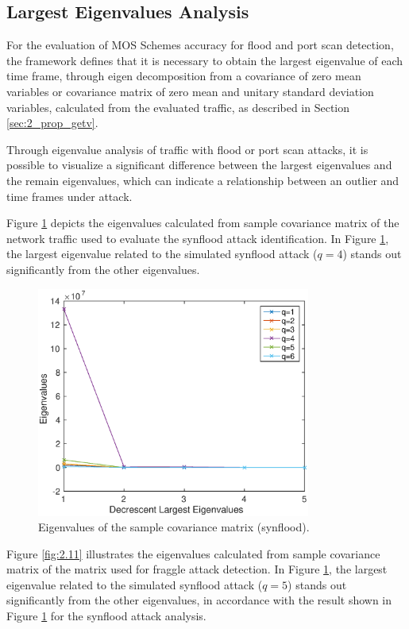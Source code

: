 \subsection{Largest Eigenvalues Analysis}
\label{sec:2_largesteigenvaluesanalysis}

For the evaluation of MOS Schemes accuracy for flood and port scan detection, the framework defines that it is necessary to obtain the largest eigenvalue of each time frame, through eigen decomposition from a covariance of zero mean variables or covariance matrix of zero mean and unitary standard deviation variables, calculated from the evaluated traffic, as described in Section \ref{sec:2_prop_getv}. 

Through eigenvalue analysis of traffic with flood or port scan attacks, it is possible to visualize a significant difference between the largest eigenvalues and the remain eigenvalues, which can indicate a relationship between an outlier and time frames under attack.

Figure \ref{fig:2.10} depicts the eigenvalues calculated from sample covariance matrix of the network traffic used to evaluate the synflood attack identification. In Figure \ref{fig:2.10}, the largest eigenvalue related to the simulated synflood attack ($q = 4$) stands out significantly from the other eigenvalues.

\begin{figure}[h!]
	\centering
     \includegraphics[width=9cm]{figures/ch2/eigenvalues_synflood.eps} 
     \caption{Eigenvalues of the sample covariance matrix (synflood).}
     \label{fig:2.10}
\end{figure}

Figure \ref{fig:2.11} illustrates the eigenvalues calculated from sample covariance matrix of the matrix used for fraggle attack detection. In Figure \ref{fig:2.10}, the largest eigenvalue related to the simulated synflood attack ($q = 5$) stands out significantly from the other eigenvalues, in accordance with the result shown in Figure \ref{fig:2.10} for the synflood attack analysis.

